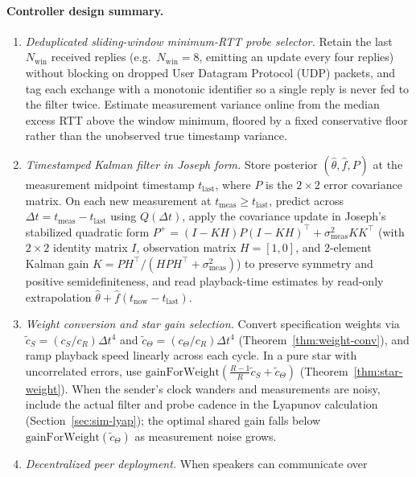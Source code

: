 \documentclass[11pt,a4paper]{article}
\theoremstyle{definition}
\begin{document}
\paragraph{Controller design summary.}
\begin{enumerate}
\item \emph{Deduplicated sliding-window minimum-RTT probe selector.} Retain the
  last $N_{\mathrm{win}}$ received replies (e.g.\ $N_{\mathrm{win}} = 8$,
  emitting an update every four replies) without blocking on dropped User
  Datagram Protocol (UDP) packets, and tag each exchange with a monotonic
  identifier so a single reply is never fed to the filter twice. Estimate
  measurement variance online from the median excess RTT above the window
  minimum, floored by a fixed conservative floor rather than the unobserved
  true timestamp variance.
\item \emph{Timestamped Kalman filter in Joseph form.} Store posterior
  $(\hat\theta, \hat f, P)$ at the measurement midpoint timestamp
  $t_{\mathrm{last}}$, where $P$ is the $2 \times 2$ error covariance matrix.
  On each new measurement at $t_{\mathrm{meas}} \ge t_{\mathrm{last}}$, predict
  across $\Delta t = t_{\mathrm{meas}} - t_{\mathrm{last}}$ using $Q(\Delta t)$,
  apply the covariance update in Joseph's stabilized quadratic form
  $P^+ = (I - K H) P (I - K H)^\top + \sigma_{\mathrm{meas}}^2 K K^\top$
  \cite{bucy1968} (with $2 \times 2$ identity matrix $I$, observation matrix
  $H = [1, 0]$, and $2$-element Kalman gain $K = P H^\top / (H P H^\top + \sigma_{\mathrm{meas}}^2)$)
  to preserve symmetry and positive semidefiniteness, and read playback-time
  estimates by read-only extrapolation
  $\hat\theta + \hat f(t_{\mathrm{now}} - t_{\mathrm{last}})$.
\item \emph{Weight conversion and star gain selection.} Convert specification
  weights via $\tilde c_S = (c_S / c_R)\Delta t^4$ and
  $\tilde c_\Theta = (c_\Theta / c_R)\Delta t^4$ (Theorem~\ref{thm:weight-conv}),
  and ramp playback speed linearly across each cycle. In a pure star with
  uncorrelated errors, use
  $\mathrm{gainForWeight}(\frac{R-1}{R}\tilde c_S + \tilde c_\Theta)$
  (Theorem~\ref{thm:star-weight}). When the sender's clock wanders and
  measurements are noisy, include the actual filter and probe cadence in the
  Lyapunov calculation (Section~\ref{sec:sim-lyap}); the optimal shared gain
  falls below $\mathrm{gainForWeight}(\tilde c_\Theta)$ as measurement noise
  grows.
\item \emph{Decentralized peer deployment.} When speakers can communicate over

\end{enumerate}
\end{document}
